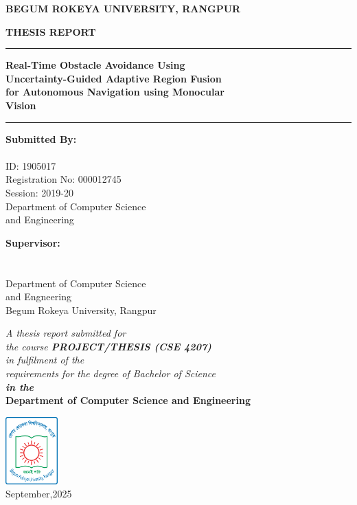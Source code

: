 \begin{titlepage}
\begin{center}
{\Large \textbf{BEGUM ROKEYA UNIVERSITY, RANGPUR}}

\vspace{1cm}
{ \normalsize \textbf{THESIS REPORT}}

\vspace{1cm}
\rule{\textwidth}{0.4pt}

\vspace{0.3cm}
{\Large \textbf{Real-Time Obstacle Avoidance Using\\
Uncertainty-Guided Adaptive Region Fusion\\
for Autonomous Navigation using Monocular\\
Vision} }
\vspace{0.3cm}

\rule{\textwidth}{0.4pt}

\vspace{1.5cm}
\begin{minipage}[t]{0.45\textwidth}
\textbf{Submitted By:}\\
\theauthor\\
ID: 1905017\\
Registration No: 000012745\\
Session: 2019-20\\
Department of Computer Science \\and Engineering
\end{minipage}
\hfill
\begin{minipage}[t]{0.45\textwidth}
\textbf{Supervisor:}\\
\thesupervisor\\
\thesupervisortitle\\
Department of Computer Science\\ and Engneering\\
Begum Rokeya University, Rangpur
\end{minipage}

\vspace{1.5cm}
\textit{A thesis report submitted for\\
the course \textbf{PROJECT/THESIS (CSE 4207)}\\
in fulfilment of the\\
requirements for the degree of Bachelor of Science\\
\textbf{in the}}\\
\large \textbf{Department of Computer Science and Engineering}

\vspace{1.5cm}
\includegraphics[width=2cm]{BRUR_Logo.svg.png}\\
\vspace{0.5cm}
\small September,2025
\end{center}
\end{titlepage}
